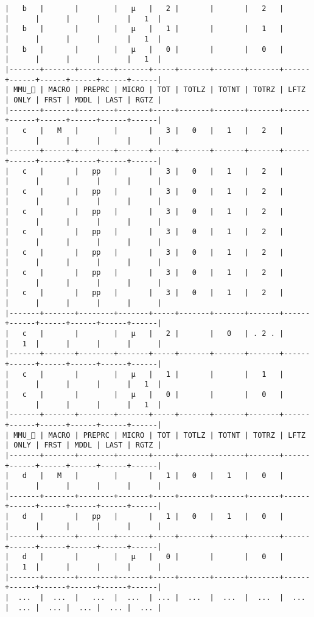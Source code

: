 \documentclass[varwidth=\maxdimen,margin=0.5cm,multi={verbatim}]{standalone}
\begin{document}
\begin{verbatim}
|   b   |       |        |   µ   |   2 |       |       |   2   |      |      |      |      |      |   1  |
|   b   |       |        |   µ   |   1 |       |       |   1   |      |      |      |      |      |   1  |
|   b   |       |        |   µ   |   0 |       |       |   0   |      |      |      |      |      |   1  |
|-------+-------+--------+-------+-----+-------+-------+-------+------+------+------+------+------+------|
| MMU_ | MACRO | PREPRC | MICRO | TOT | TOTLZ | TOTNT | TOTRZ | LFTZ | ONLY | FRST | MDDL | LAST | RGTZ |
|-------+-------+--------+-------+-----+-------+-------+-------+------+------+------+------+------+------|
|   c   |   M   |        |       |   3 |   0   |   1   |   2   |      |      |      |      |      |      |
|-------+-------+--------+-------+-----+-------+-------+-------+------+------+------+------+------+------|
|   c   |       |   pp   |       |   3 |   0   |   1   |   2   |      |      |      |      |      |      |
|   c   |       |   pp   |       |   3 |   0   |   1   |   2   |      |      |      |      |      |      |
|   c   |       |   pp   |       |   3 |   0   |   1   |   2   |      |      |      |      |      |      |
|   c   |       |   pp   |       |   3 |   0   |   1   |   2   |      |      |      |      |      |      |
|   c   |       |   pp   |       |   3 |   0   |   1   |   2   |      |      |      |      |      |      |
|   c   |       |   pp   |       |   3 |   0   |   1   |   2   |      |      |      |      |      |      |
|   c   |       |   pp   |       |   3 |   0   |   1   |   2   |      |      |      |      |      |      |
|-------+-------+--------+-------+-----+-------+-------+-------+------+------+------+------+------+------|
|   c   |       |        |   µ   |   2 |       |   0   | . 2 . |      |   1  |      |      |      |      |
|-------+-------+--------+-------+-----+-------+-------+-------+------+------+------+------+------+------|
|   c   |       |        |   µ   |   1 |       |       |   1   |      |      |      |      |      |   1  |
|   c   |       |        |   µ   |   0 |       |       |   0   |      |      |      |      |      |   1  |
|-------+-------+--------+-------+-----+-------+-------+-------+------+------+------+------+------+------|
| MMU_ | MACRO | PREPRC | MICRO | TOT | TOTLZ | TOTNT | TOTRZ | LFTZ | ONLY | FRST | MDDL | LAST | RGTZ |
|-------+-------+--------+-------+-----+-------+-------+-------+------+------+------+------+------+------|
|   d   |   M   |        |       |   1 |   0   |   1   |   0   |      |      |      |      |      |      |
|-------+-------+--------+-------+-----+-------+-------+-------+------+------+------+------+------+------|
|   d   |       |   pp   |       |   1 |   0   |   1   |   0   |      |      |      |      |      |      |
|-------+-------+--------+-------+-----+-------+-------+-------+------+------+------+------+------+------|
|   d   |       |        |   µ   |   0 |       |       |   0   |      |   1  |      |      |      |      |
|-------+-------+--------+-------+-----+-------+-------+-------+------+------+------+------+------+------|
|  ...  |  ...  |   ...  |  ...  | ... |  ...  |  ...  |  ...  |  ... |  ... |  ... |  ... |  ... |  ... |
\end{verbatim}
\end{document}

